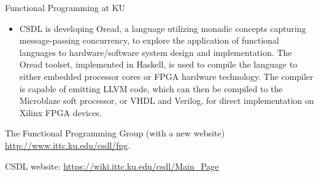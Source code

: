 \documentclass{scrreprt}
\begin{document}
\begin{hcarentry}{Functional Programming at KU}
\begin{itemize}
\item CSDL is developing Oread, a language utilizing monadic concepts capturing message-passing concurrency, to explore the application of functional languages to hardware/software system design and implementation. The Oread toolset, implemented in Haskell,  is used to compile the language to either embedded processor cores or FPGA hardware technology. The compiler is capable of emitting LLVM code, which can then be compiled to the Microblaze soft processor, or VHDL and Verilog, for direct implementation on Xilinx FPGA devices.
\end{itemize}


\FurtherReading
  The Functional Programming Group (with a new website)  
    \url{http://www.ittc.ku.edu/csdl/fpg}.

  CSDL website: \url{https://wiki.ittc.ku.edu/csdl/Main_Page}
\end{hcarentry}
\end{document}
